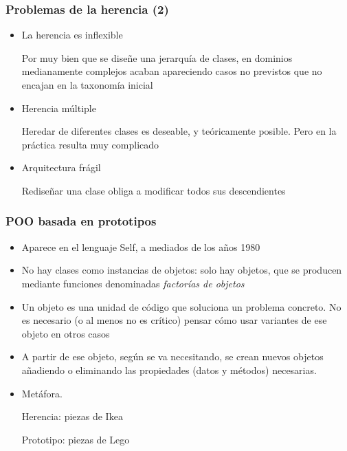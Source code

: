 \documentclass[ucs]{beamer}
\begin{document}
\begin{frame}[fragile]
\frametitle{Problemas de la herencia (2)}

\begin{itemize}
\item
La herencia es inflexible 

Por muy bien que se diseñe una jerarquía
de clases, en dominios medianamente complejos acaban apareciendo casos no previstos
que  no encajan en la taxonomía inicial

\item
Herencia múltiple

Heredar de diferentes clases es deseable, y
teóricamente posible. Pero en la práctica
resulta
muy complicado

\item
Arquitectura frágil

Rediseñar una clase obliga a modificar todos sus descendientes
\end{itemize}
\end{frame}

\begin{frame}[fragile]
\frametitle{POO basada en prototipos}

\begin{itemize}
\item
Aparece en el lenguaje Self, a mediados de los años 1980

\item
No hay clases como instancias de objetos: solo hay objetos, que se producen
mediante funciones denominadas \emph{factorías de objetos}

\item
Un objeto es una unidad de código que soluciona un problema concreto. No es
necesario (o al menos no es crítico) pensar cómo usar variantes de ese objeto
en otros casos

\item
A partir de ese objeto, según se va necesitando, se crean nuevos objetos
añadiendo o eliminando las propiedades (datos y métodos) necesarias.

\item
Metáfora. 

Herencia: piezas de Ikea 

Prototipo: piezas de Lego
\end{itemize}
\end{frame}
\end{document}
